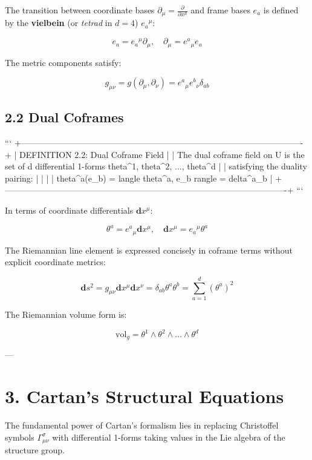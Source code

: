 \documentclass[11pt,twoside,openright]{amsbook}
\begin{document}
{{{{{{The transition between coordinate bases $\partial_\mu = \frac{\partial}{\partial x^\mu}$ and frame bases $e_a$ is defined by the \textbf{vielbein} (or \textit{tetrad} in $d=4$) $e_a{}^\mu$:

$$e_a = e_a{}^\mu \partial_\mu, \quad \partial_\mu = e^a{}_\mu e_a$$

The metric components satisfy:

$$g_{\mu\nu} = g(\partial_\mu, \partial_\nu) = e^a{}_\mu e^b{}_\nu \delta_{ab}$$

\subsection{2.2 Dual Coframes}

```
+----------------------------------------------------------------------------------------------------+
| DEFINITION 2.2: Dual Coframe Field                                                                 |
| The dual coframe field on U is the set of d differential 1-forms {theta^1, theta^2, ..., theta^d}  |
| satisfying the duality pairing:                                                                    |
|                                                                                                    |
|   theta^a(e_b) = langle theta^a, e_b rangle = delta^a{}_b                                          |
+----------------------------------------------------------------------------------------------------+
```

In terms of coordinate differentials $\mathbf{d}x^\mu$:

$$\theta^a = e^a{}_\mu \mathbf{d}x^\mu, \quad \mathbf{d}x^\mu = e_a{}^\mu \theta^a$$

The Riemannian line element is expressed concisely in coframe terms without explicit coordinate metrics:

$$\mathbf{d}s^2 = g_{\mu\nu} \mathbf{d}x^\mu \mathbf{d}x^\nu = \delta_{ab} \theta^a \theta^b = \sum_{a=1}^d (\theta^a)^2$$

The Riemannian volume form is:

$$\mathrm{vol}_g = \theta^1 \wedge \theta^2 \wedge \dots \wedge \theta^d$$

---

\section{3. Cartan's Structural Equations}

The fundamental power of Cartan's formalism lies in replacing Christoffel symbols $\Gamma^\sigma_{\mu\nu}$ with differential 1-forms taking values in the Lie algebra of the structure group.

}}}}}}
\end{document}
